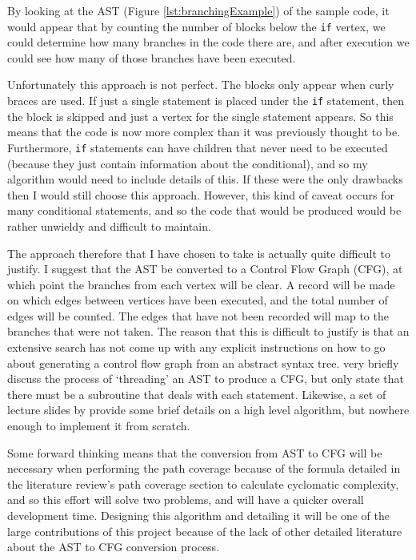 By looking at the AST (Figure \ref{lst:branchingExample}) of the sample code, it would appear that by counting the number of blocks below the \verb|if| vertex, we could determine how many branches in the code there are, and after execution we could see how many of those branches have been executed.

Unfortunately this approach is not perfect. The blocks only appear when curly braces are used. If just a single statement is placed under the \verb|if| statement, then the block is skipped and just a vertex for the single statement appears. So this means that the code is now more complex than it was previously thought to be. Furthermore, \verb|if| statements can have children that never need to be executed (because they just contain information about the conditional), and so my algorithm would need to include details of this. If these were the only drawbacks then I would still choose this approach. However, this kind of caveat occurs for many conditional statements, and so the code that would be produced would be rather unwieldy and difficult to maintain.

The approach therefore that I have chosen to take is actually quite difficult to justify. I suggest that the AST be converted to a Control Flow Graph (CFG), at which point the branches from each vertex will be clear. A record will be made on which edges between vertices have been executed, and the total number of edges will be counted. The edges that have not been recorded will map to the branches that were not taken. The reason that this is difficult to justify is that an extensive search has not come up with any explicit instructions on how to go about generating a control flow graph from an abstract syntax tree. \citet{grune2000modern} very briefly discuss the process of `threading' an AST to produce a CFG, but only state that there must be a subroutine that deals with each statement. Likewise, a set of lecture slides by \citet{compilersIntro} provide some brief details on a high level algorithm, but nowhere enough to implement it from scratch.

Some forward thinking means that the conversion from AST to CFG will be necessary when performing the path coverage because of the formula detailed in the literature review's path coverage section to calculate cyclomatic complexity, and so this effort will solve two problems, and will have a quicker overall development time. Designing this algorithm and detailing it will be one of the large contributions of this project because of the lack of other detailed literature about the AST to CFG conversion process.

